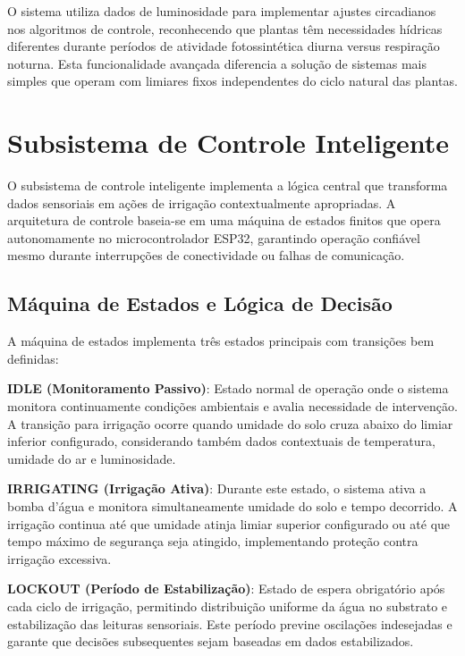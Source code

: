 \documentclass[twoside,english,brazilian]{UNISINOSmonografia}
\begin{document}
O sistema utiliza dados de luminosidade para implementar ajustes circadianos nos algoritmos de controle, reconhecendo que plantas têm necessidades hídricas diferentes durante períodos de atividade fotossintética diurna versus respiração noturna. Esta funcionalidade avançada diferencia a solução de sistemas mais simples que operam com limiares fixos independentes do ciclo natural das plantas.

\section{Subsistema de Controle Inteligente}

O subsistema de controle inteligente implementa a lógica central que transforma dados sensoriais em ações de irrigação contextualmente apropriadas. A arquitetura de controle baseia-se em uma máquina de estados finitos que opera autonomamente no microcontrolador ESP32, garantindo operação confiável mesmo durante interrupções de conectividade ou falhas de comunicação.

\subsection{Máquina de Estados e Lógica de Decisão}

A máquina de estados implementa três estados principais com transições bem definidas:

\textbf{IDLE (Monitoramento Passivo)}: Estado normal de operação onde o sistema monitora continuamente condições ambientais e avalia necessidade de intervenção. A transição para irrigação ocorre quando umidade do solo cruza abaixo do limiar inferior configurado, considerando também dados contextuais de temperatura, umidade do ar e luminosidade.

\textbf{IRRIGATING (Irrigação Ativa)}: Durante este estado, o sistema ativa a bomba d'água e monitora simultaneamente umidade do solo e tempo decorrido. A irrigação continua até que umidade atinja limiar superior configurado ou até que tempo máximo de segurança seja atingido, implementando proteção contra irrigação excessiva.

\textbf{LOCKOUT (Período de Estabilização)}: Estado de espera obrigatório após cada ciclo de irrigação, permitindo distribuição uniforme da água no substrato e estabilização das leituras sensoriais. Este período previne oscilações indesejadas e garante que decisões subsequentes sejam baseadas em dados estabilizados.

\end{document}
